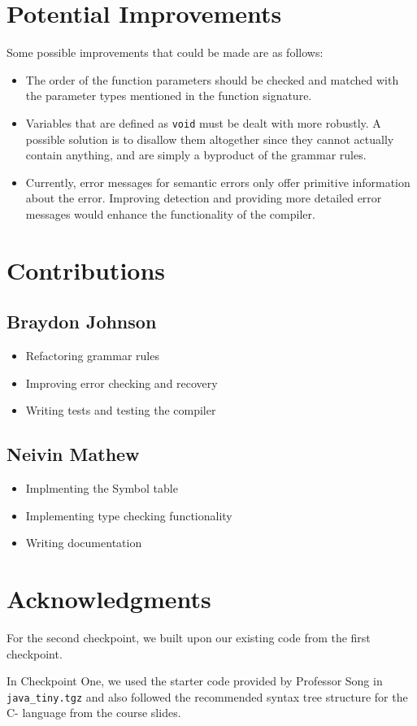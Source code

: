 \documentclass[12pt, letterpaper]{article}
\begin{document}
\section{Potential Improvements}
Some possible improvements that could be made are as follows:
\begin{itemize}
\item The order of the function parameters should be checked and matched with the parameter types mentioned in the function signature.
\item Variables that are defined as \texttt{void} must be dealt with more robustly. A possible solution is to disallow them altogether since they cannot actually contain anything, and are simply a byproduct of the grammar rules.
\item Currently, error messages for semantic errors only offer primitive information about the error. Improving detection and providing more detailed error messages would enhance the functionality of the compiler.
\end{itemize}

\clearpage
\section{Contributions}
\subsection{Braydon Johnson}
\begin{itemize}
\setlength\itemsep{0em}
\item Refactoring grammar rules
\item Improving error checking and recovery
\item Writing tests and testing the compiler
\end{itemize}
\subsection{Neivin Mathew}
\begin{itemize}
\setlength\itemsep{0em}
\item Implmenting the Symbol table
\item Implementing type checking functionality
\item Writing documentation
\end{itemize}

\section{Acknowledgments}
For the second checkpoint, we built upon our existing code from the first checkpoint.

In Checkpoint One, we used the starter code provided by Professor Song in \texttt{java\_tiny.tgz} and also followed the recommended syntax tree structure for the C- language from the course slides.
\end{document}
